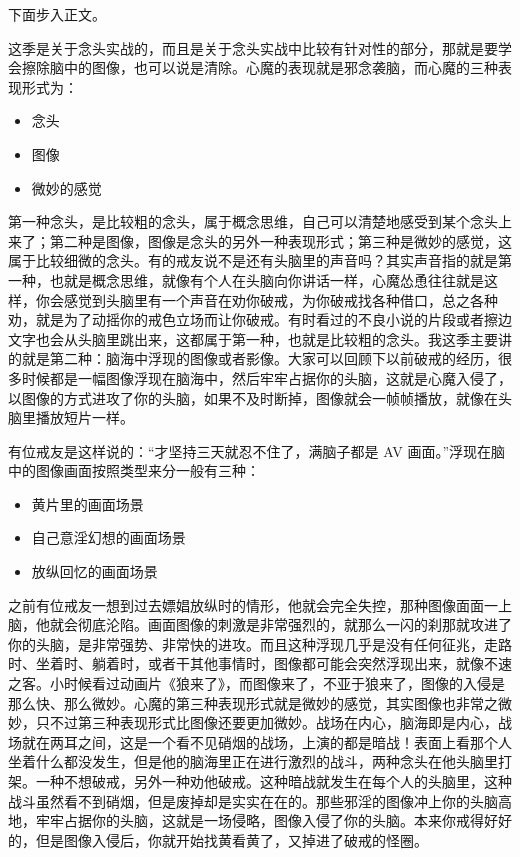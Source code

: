 下面步入正文。

这季是关于念头实战的，而且是关于念头实战中比较有针对性的部分，那就是要学会擦除脑中的图像，也可以说是清除。心魔的表现就是邪念袭脑，而心魔的三种表现形式为：

\begin{multicols}{3}
    \begin{itemize}
        \item 念头
        \item 图像
        \item 微妙的感觉
    \end{itemize}
\end{multicols}

第一种念头，是比较粗的念头，属于概念思维，自己可以清楚地感受到某个念头上来了；第二种是图像，图像是念头的另外一种表现形式；第三种是微妙的感觉，这属于比较细微的念头。有的戒友说不是还有头脑里的声音吗？其实声音指的就是第一种，也就是概念思维，就像有个人在头脑向你讲话一样，心魔怂恿往往就是这样，你会感觉到头脑里有一个声音在劝你破戒，为你破戒找各种借口，总之各种劝，就是为了动摇你的戒色立场而让你破戒。有时看过的不良小说的片段或者擦边文字也会从头脑里跳出来，这都属于第一种，也就是比较粗的念头。我这季主要讲的就是第二种：脑海中浮现的图像或者影像。大家可以回顾下以前破戒的经历，很多时候都是一幅图像浮现在脑海中，然后牢牢占据你的头脑，这就是心魔入侵了，以图像的方式进攻了你的头脑，如果不及时断掉，图像就会一帧帧播放，就像在头脑里播放短片一样。

有位戒友是这样说的：“才坚持三天就忍不住了，满脑子都是 AV 画面。”浮现在脑中的图像画面按照类型来分一般有三种：

\begin{multicols}{3}
    \begin{itemize}
        \item 黄片里的画面场景
        \item 自己意淫幻想的画面场景
        \item 放纵回忆的画面场景
    \end{itemize}
\end{multicols}

之前有位戒友一想到过去嫖娼放纵时的情形，他就会完全失控，那种图像面面一上脑，他就会彻底沦陷。画面图像的刺激是非常强烈的，就那么一闪的刹那就攻进了你的头脑，是非常强势、非常快的进攻。而且这种浮现几乎是没有任何征兆，走路时、坐着时、躺着时，或者干其他事情时，图像都可能会突然浮现出来，就像不速之客。小时候看过动画片《狼来了》，而图像来了，不亚于狼来了，图像的入侵是那么快、那么微妙。心魔的第三种表现形式就是微妙的感觉，其实图像也非常之微妙，只不过第三种表现形式比图像还要更加微妙。战场在内心，脑海即是内心，战场就在两耳之间，这是一个看不见硝烟的战场，上演的都是暗战！表面上看那个人坐着什么都没发生，但是他的脑海里正在进行激烈的战斗，两种念头在他头脑里打架。一种不想破戒，另外一种劝他破戒。这种暗战就发生在每个人的头脑里，这种战斗虽然看不到硝烟，但是废掉却是实实在在的。那些邪淫的图像冲上你的头脑高地，牢牢占据你的头脑，这就是一场侵略，图像入侵了你的头脑。本来你戒得好好的，但是图像入侵后，你就开始找黄看黄了，又掉进了破戒的怪圈。

